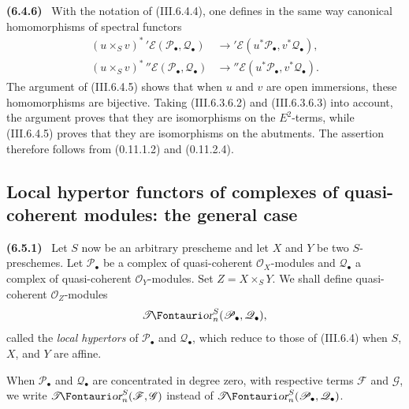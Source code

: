\documentclass[10pt,oneside]{book}
\newcommand{\sh}[1]{\mathscr{#1}}
\newcommand{\shTor}{\sh{T}\textup{\kern-2.2pt{\Fontauri\slshape or}}}
\newcommand{\sref}[2][]{(#2)}
\newenvironment{env}[1][]{\par\medskip\noindent\textbf{(#1)}\ }{\par}
\begin{document}
\begin{env}[6.4.6]
\label{III.6.4.6}
With the notation of \sref{III.6.4.4}, one defines in the same way
canonical homomorphisms of spectral functors
\[
  \begin{aligned}
  (u\times_Sv)^*\,{}'\sh E(\sh P_\bullet,\sh Q_\bullet)
  &\longrightarrow
  {}'\sh E(u^*\sh P_\bullet,v^*\sh Q_\bullet),\\
  (u\times_Sv)^*\,{}''\sh E(\sh P_\bullet,\sh Q_\bullet)
  &\longrightarrow
  {}''\sh E(u^*\sh P_\bullet,v^*\sh Q_\bullet).
  \end{aligned}
  \tag{6.4.6.1}\label{III.6.4.6.1}
\]
The argument of \sref{III.6.4.5} shows that when $u$ and $v$ are
open immersions, these homomorphisms are bijective.  Taking
\sref{III.6.3.6.2} and \sref{III.6.3.6.3} into account, the
argument proves that they are isomorphisms on the $E^2$-terms,
while \sref{III.6.4.5} proves that they are isomorphisms on the
abutments.  The assertion therefore follows from
\sref[0]{0.11.1.2} and \sref[0]{0.11.2.4}.
\end{env}


\subsection{Local hypertor functors of complexes of quasi-coherent modules: the general case}
\label{subsection:III.6.5}

\begin{env}[6.5.1]
\label{III.6.5.1}
Let $S$ now be an arbitrary prescheme and let $X$ and $Y$ be two
$S$-preschemes.  Let $\sh P_\bullet$ be a complex of quasi-coherent
$\sh O_X$-modules and $\sh Q_\bullet$ a complex of quasi-coherent
$\sh O_Y$-modules.  Set $Z=X\times_SY$.  We shall define
quasi-coherent $\sh O_Z$-modules
\[
  \shTor_n^S(\sh P_\bullet,\sh Q_\bullet),
\]
called the \emph{local hypertors} of $\sh P_\bullet$ and
$\sh Q_\bullet$, which reduce to those of \sref{III.6.4} when
$S$, $X$, and $Y$ are affine.

When $\sh P_\bullet$ and $\sh Q_\bullet$ are concentrated in
degree zero, with respective terms $\sh F$ and $\sh G$, we write
$\shTor_n^S(\sh F,\sh G)$ instead of
$\shTor_n^S(\sh P_\bullet,\sh Q_\bullet)$.
\end{env}
\end{document}
